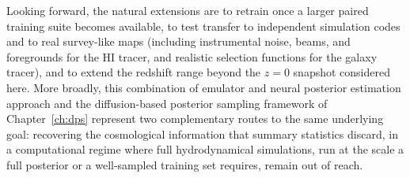 Looking forward, the natural extensions are to retrain \HGL once a larger
paired training suite becomes available, to test transfer to independent
simulation codes and to real survey-like maps (including instrumental noise,
beams, and foregrounds for the HI tracer, and realistic selection functions
for the galaxy tracer), and to extend the redshift range beyond the $z=0$
snapshot considered here. More broadly, this combination of emulator and neural posterior estimation approach and the diffusion-based posterior sampling framework of Chapter~\ref{ch:dps}
represent two complementary routes to the same underlying goal: recovering
the cosmological information that summary statistics discard, in a
computational regime where full hydrodynamical simulations, run at the
scale a full posterior or a well-sampled training set requires, remain out of reach.
